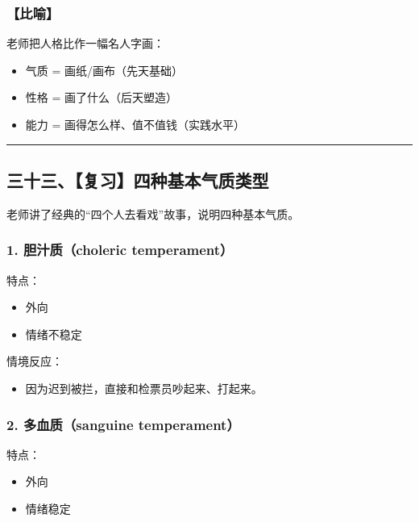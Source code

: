 \documentclass[
  chinese,
  9pt,
  a4paper,
]{ctexart}
\providecommand{\tightlist}{%
  \setlength{\itemsep}{0pt}\setlength{\parskip}{0pt}}
\begin{document}
\subsubsection{【比喻】}\label{ux6bd4ux55bb}

老师把人格比作一幅名人字画：

\begin{itemize}
\tightlist
\item
  气质 = 画纸/画布（先天基础）
\item
  性格 = 画了什么（后天塑造）
\item
  能力 = 画得怎么样、值不值钱（实践水平）
\end{itemize}

\begin{center}\rule{0.5\linewidth}{0.5pt}\end{center}

\subsection{三十三、【复习】四种基本气质类型}\label{ux4e09ux5341ux4e09ux590dux4e60ux56dbux79cdux57faux672cux6c14ux8d28ux7c7bux578b}

老师讲了经典的``四个人去看戏''故事，说明四种基本气质。

\subsubsection{1. 胆汁质（choleric
temperament）}\label{ux80c6ux6c41ux8d28choleric-temperament}

特点：

\begin{itemize}
\tightlist
\item
  外向
\item
  情绪不稳定
\end{itemize}

情境反应：

\begin{itemize}
\tightlist
\item
  因为迟到被拦，直接和检票员吵起来、打起来。
\end{itemize}

\subsubsection{2. 多血质（sanguine
temperament）}\label{ux591aux8840ux8d28sanguine-temperament}

特点：

\begin{itemize}
\tightlist
\item
  外向
\item
  情绪稳定
\end{itemize}
\end{document}
